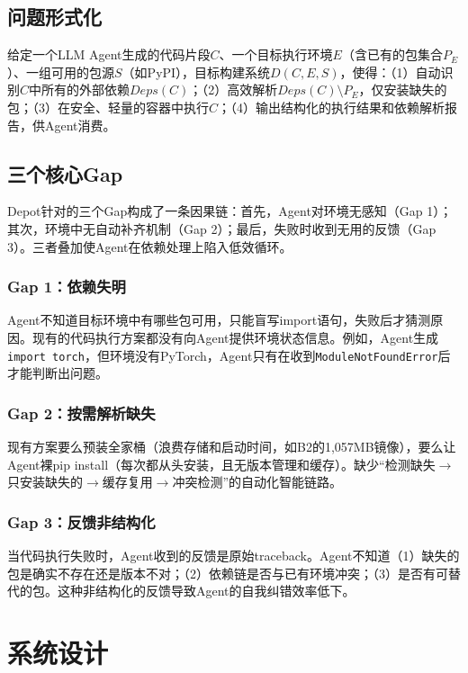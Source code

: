 \documentclass[10pt]{ctexart}
\begin{document}
\subsection{问题形式化}
给定一个LLM Agent生成的代码片段$C$、一个目标执行环境$E$（含已有的包集合$P_E$）、一组可用的包源$S$（如PyPI），目标构建系统$D(C, E, S)$，使得：（1）自动识别$C$中所有的外部依赖$Deps(C)$；（2）高效解析$Deps(C) \setminus P_E$，仅安装缺失的包；（3）在安全、轻量的容器中执行$C$；（4）输出结构化的执行结果和依赖解析报告，供Agent消费。

\subsection{三个核心Gap}
Depot针对的三个Gap构成了一条因果链：首先，Agent对环境无感知（Gap 1）；其次，环境中无自动补齐机制（Gap 2）；最后，失败时收到无用的反馈（Gap 3）。三者叠加使Agent在依赖处理上陷入低效循环。

\subsubsection{Gap 1：依赖失明}
Agent不知道目标环境中有哪些包可用，只能盲写import语句，失败后才猜测原因。现有的代码执行方案都没有向Agent提供环境状态信息。例如，Agent生成\texttt{import torch}，但环境没有PyTorch，Agent只有在收到\texttt{ModuleNotFoundError}后才能判断出问题。

\subsubsection{Gap 2：按需解析缺失}
现有方案要么预装全家桶（浪费存储和启动时间，如B2的1,057MB镜像），要么让Agent裸pip install（每次都从头安装，且无版本管理和缓存）。缺少“检测缺失$\rightarrow$只安装缺失的$\rightarrow$缓存复用$\rightarrow$冲突检测”的自动化智能链路。

\subsubsection{Gap 3：反馈非结构化}
当代码执行失败时，Agent收到的反馈是原始traceback。Agent不知道（1）缺失的包是确实不存在还是版本不对；（2）依赖链是否与已有环境冲突；（3）是否有可替代的包。这种非结构化的反馈导致Agent的自我纠错效率低下。

\section{系统设计}
\end{document}
